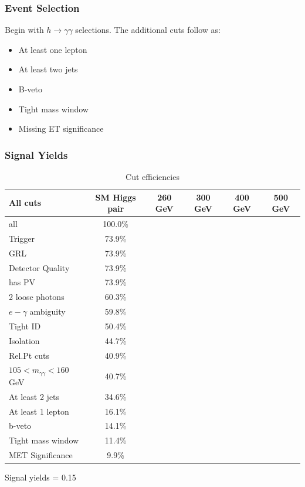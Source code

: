\documentclass[preprint,review,16px]{beamer}
\begin{document}
\begin{frame}%
\vspace{3mm}
\frametitle{Event Selection}
Begin with $h\rightarrow \gamma\gamma$ selections. The additional cuts follow as:
  \begin{itemize}
    \item At least one lepton
    \item At least two jets
    \item B-veto
    \item Tight mass window
    \item Missing ET significance
  \end{itemize}
\vspace{3mm}
\end{frame}


\begin{frame}%
\vspace{3mm}
\frametitle{Signal Yields}

\begin{table}[!ht]
\tiny
\begin{center}
\begin{tabular}{l|ccccc}
\hline
All cuts                        & SM Higgs pair   &260 GeV &300 GeV &400 GeV &500 GeV \\
\hline
all                             & 100.0\%  &&&&\\
Trigger                         & 73.9\%   &&&&\\
GRL                             & 73.9\%   &&&&\\
Detector Quality                & 73.9\%   &&&&\\
has PV                          & 73.9\%   &&&&\\
2 loose photons                 & 60.3\%   &&&&\\
$e-\gamma$ ambiguity            & 59.8\%   &&&&\\
Tight ID                        & 50.4\%   &&&&\\
Isolation                       & 44.7\%   &&&&\\
Rel.Pt cuts                     & 40.9\%   &&&&\\
$105<m_{\gamma\gamma}<160$ GeV  & 40.7\%   &&&&\\
At least 2 jets                 & 34.6\%   &&&&\\
At least 1 lepton               & 16.1\%   &&&&\\
b-veto                          & 14.1\%   &&&&\\
Tight mass window               & 11.4\%   &&&&\\
MET Significance                & 9.9\%    &&&&\\

\hline
\end{tabular}
\caption{Cut efficiencies}
\label{tab:eventselection}
\end{center}
\end{table}

Signal yields = 0.15

\vspace{3mm}
\end{frame}
\end{document}
